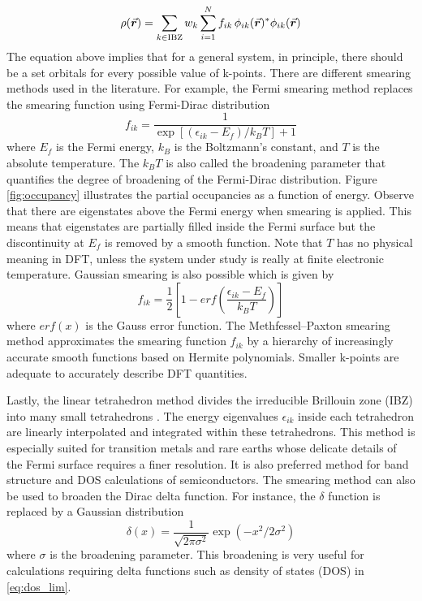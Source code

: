 \begin{equation} \label{eq:rho_general}
	\rho({\va*{r}}) = \sum_{k \in \text{IBZ}} w_k \sum_{i=1}^N f_{ik}\, \phi_{ik}(\va*{r})^* \phi_{ik}(\va*{r})
\end{equation}
The equation above implies that for a  general system, in principle, there should be a  set orbitals for every possible value of k-points. There are different smearing methods used in the literature. For example, the Fermi smearing method replaces the smearing function using Fermi-Dirac distribution \citep{Dirac1926,Fermi1926}
\begin{equation}
    f_{ik} = \frac{1}{\exp[(\epsilon_{ik} - E_f)/k_B T] + 1}
\end{equation}
where $E_f$ is the Fermi energy, $k_B$ is the Boltzmann's constant, and $T$ is the absolute temperature. The $k_B T$ is also called the broadening parameter that quantifies the degree of broadening of the Fermi-Dirac distribution. Figure \ref{fig:occupancy} illustrates the partial occupancies as a function of energy. Observe that there are eigenstates above the Fermi energy when smearing is applied. This means that eigenstates are partially filled inside the Fermi surface but the discontinuity at $E_f$ is removed by a smooth function. Note that $T$ has no physical meaning in DFT, unless the  system under study is really at finite electronic temperature. Gaussian smearing is also possible which is given by \citep{Fu1983}
\begin{equation}
    f_{ik} = \frac{1}{2} \left[1-erf\left(\frac{\epsilon_{ik} - E_f}{k_B T} \right)\right]
\end{equation}
where $erf(x)$ is the Gauss error function. The Methfessel–Paxton smearing method \citep{Methfessel1989}  approximates  the smearing function $f_{ik}$ by a hierarchy of increasingly accurate smooth functions based on Hermite polynomials. Smaller k-points are adequate to accurately describe DFT quantities. 

Lastly, the linear tetrahedron method divides the irreducible Brillouin zone (IBZ) into many small tetrahedrons \citep{Bloechl1994a}. The energy eigenvalues $\epsilon_{ik}$ inside each tetrahedron are  linearly
interpolated and integrated within these tetrahedrons. This method is especially suited for  transition metals and rare earths whose delicate details of the Fermi surface requires a finer resolution. It  is also preferred method for band structure and DOS calculations of semiconductors. The smearing method can also be used to broaden the Dirac delta function. For instance, the $\delta$ function is replaced by a Gaussian distribution
\begin{equation}
    \delta(x) = \frac{1}{\sqrt{2 \pi \sigma^2}} \exp(-x^2/2\sigma^2)
\end{equation}
where $\sigma$ is the broadening parameter. This broadening  is very useful for calculations requiring delta functions such as density of states (DOS) in \eqref{eq:dos_lim}.

